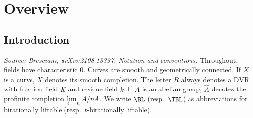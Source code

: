 \chapter{Overview}
\label{chap:overview}


\section{Introduction}


\begin{remark}
  \label{rem:notation}
  \textit{Source: Bresciani, arXiv:2108.13397, Notation and conventions.}
  Throughout, fields have characteristic \(0\). Curves are smooth and geometrically
  connected. If \(X\) is a curve, \(\bar{X}\) denotes its smooth completion. The
  letter \(R\) always denotes a DVR with fraction field \(K\) and residue field \(k\).
  If \(A\) is an abelian group, \(\hat{A}\) denotes the profinite completion
  \(\varprojlim_{n} A/nA\). We write \(\BL\) (resp.\ \(\TBL\)) as abbreviations for
  birationally liftable (resp.\ \(t\)-birationally liftable).
\end{remark}


